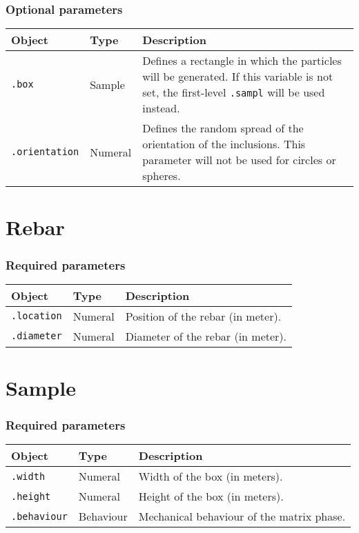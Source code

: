 \documentclass[10pt]{article}
\begin{document}
\subsubsection*{Optional parameters}

\begin{tabularx}{\textwidth}{llX}
\hline 
Object & Type & Description \\ 
\hline 
\verb+.box+ & Sample & Defines a rectangle in which the particles will be generated. If this variable is not set, the first-level \verb+.sampl+ will be used instead. \\ 
\verb+.orientation+ & Numeral & Defines the random spread of the orientation of the inclusions. This parameter will not be used for circles or spheres. \\ 
\hline 
\end{tabularx}

\section{Rebar}

\subsubsection*{Required parameters}

\begin{tabularx}{\textwidth}{llX}
\hline 
Object & Type & Description \\ 
\hline 
\verb+.location+ & Numeral & Position of the rebar (in meter). \\ 
\verb+.diameter+ & Numeral & Diameter of the rebar (in meter).\\
\hline 
\end{tabularx}

\section{Sample}

\subsubsection*{Required parameters}

\begin{tabularx}{\textwidth}{llX}
\hline 
Object & Type & Description \\ 
\hline 
\verb+.width+ & Numeral & Width of the box (in meters). \\ 
\verb+.height+ & Numeral & Height of the box (in meters). \\ 
\verb+.behaviour+ & Behaviour & Mechanical behaviour of the matrix phase. \\ 
\hline 
\end{tabularx}
\end{document}
